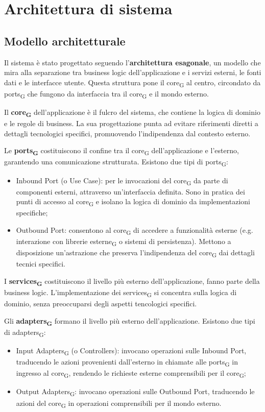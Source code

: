 \section{Architettura di sistema }
\subsection{Modello architetturale}
Il sistema è stato progettato seguendo l'\textbf{architettura esagonale}, un modello che mira alla separazione tra business logic dell'applicazione e i servizi esterni, le fonti dati e le interfacce utente. Questa struttura pone il core\textsubscript{G} al centro, circondato da ports\textsubscript{G} che fungono da interfaccia tra il core\textsubscript{G} e il mondo esterno.

Il \textbf{core\textsubscript{G}} dell'applicazione è il fulcro del sistema, che contiene la logica di dominio e le regole di business. La sua progettazione punta ad evitare riferimenti diretti a dettagli tecnologici specifici, promuovendo l'indipendenza dal contesto esterno.

Le \textbf{ports\textsubscript{G}} costituiscono il confine tra il core\textsubscript{G} dell'applicazione e l'esterno, garantendo una comunicazione strutturata. Esistono due tipi di ports\textsubscript{G}: 
\begin{itemize}
    \item Inbound Port (o Use Case): per le invocazioni del core\textsubscript{G} da parte di componenti esterni, attraverso un'interfaccia definita. Sono in pratica dei punti di accesso al core\textsubscript{G} e isolano la logica di dominio da implementazioni specifiche;
    \item Outbound Port: consentono al core\textsubscript{G} di accedere a funzionalità esterne (e.g. interazione con librerie esterne\textsubscript{G} o sistemi di persistenza). Mettono a disposizione un'astrazione che preserva l'indipendenza del core\textsubscript{G} dai dettagli tecnici specifici. 
\end{itemize}

I \textbf{services\textsubscript{G}} costituiscono il livello più esterno dell'applicazione, fanno parte della business logic. L'implementazione dei services\textsubscript{G} si concentra sulla logica di dominio, senza preoccuparsi degli aspetti tencologici specifici.

Gli \textbf{adapters\textsubscript{G}} formano il livello più esterno dell'applicazione. Esistono due tipi di adapters\textsubscript{G}: 
\begin{itemize}
    \item Input Adapters\textsubscript{G} (o Controllers): invocano operazioni sulle Inbound Port, traducendo le azioni provenienti dall'esterno in chiamate alle ports\textsubscript{G} in ingresso al core\textsubscript{G}, rendendo le richieste esterne comprensibili per il core\textsubscript{G};
    \item Output Adapters\textsubscript{G}: invocano operazioni sulle Outbound Port, traducendo le azioni del core\textsubscript{G} in operazioni comprensibili per il mondo esterno.
\end{itemize}

